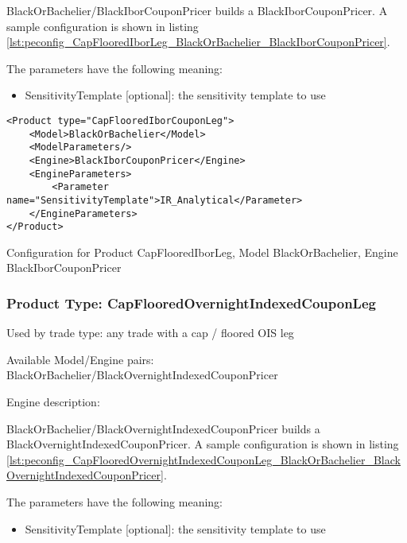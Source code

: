 BlackOrBachelier/BlackIborCouponPricer builds a BlackIborCouponPricer. A sample configuration is
shown in listing \ref{lst:peconfig_CapFlooredIborLeg_BlackOrBachelier_BlackIborCouponPricer}.

The parameters have the following meaning:

\begin{itemize}
\item SensitivityTemplate [optional]: the sensitivity template to use 
\end{itemize}

\begin{longlisting}
\begin{verbatim}
<Product type="CapFlooredIborCouponLeg">
    <Model>BlackOrBachelier</Model>
    <ModelParameters/>
    <Engine>BlackIborCouponPricer</Engine>
    <EngineParameters>
        <Parameter name="SensitivityTemplate">IR_Analytical</Parameter>
    </EngineParameters>
</Product>
\end{verbatim}
\caption{Configuration for Product CapFlooredIborLeg, Model BlackOrBachelier, Engine BlackIborCouponPricer}
\label{lst:peconfig_CapFlooredIborLeg_BlackOrBachelier_BlackIborCouponPricer}
\end{longlisting}

\subsubsection{Product Type: CapFlooredOvernightIndexedCouponLeg}

Used by trade type: any trade with a cap / floored OIS leg

Available Model/Engine pairs: BlackOrBachelier/BlackOvernightIndexedCouponPricer

Engine description:

BlackOrBachelier/BlackOvernightIndexedCouponPricer builds a BlackOvernightIndexedCouponPricer. A sample configuration is
shown in listing \ref{lst:peconfig_CapFlooredOvernightIndexedCouponLeg_BlackOrBachelier_BlackOvernightIndexedCouponPricer}.

The parameters have the following meaning:

\begin{itemize}
\item SensitivityTemplate [optional]: the sensitivity template to use 
\end{itemize}

